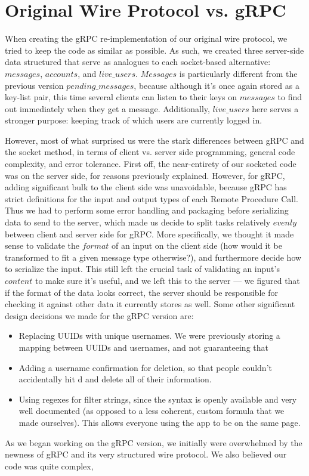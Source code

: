 \documentclass[
	a4paper, %
	10pt, %
	unnumberedsections, %
	twoside, %
]{LTJournalArticle}
\begin{document}
\section{Original Wire Protocol vs. gRPC}
When creating the gRPC re-implementation of our original wire protocol, we tried to keep the code as similar as possible. As such, we created three server-side data structured that serve as analogues to each socket-based alternative: $messages$, $accounts$, and $live\_users$. $Messages$ is particularly different from the previous version $pending\_messages$, because although it's once again stored as a key-list pair, this time several clients can listen to their keys on $messages$ to find out immediately when they get a message. Additionally, $live\_users$ here serves a stronger purpose: keeping track of which users are currently logged in.

However, most of what surprised us were the stark differences between gRPC and the socket method, in terms of client vs. server side programming, general code complexity, and error tolerance. First off, the near-entirety of our socketed code was on the server side, for reasons previously explained. However, for gRPC, adding significant bulk to the client side was unavoidable, because gRPC has strict definitions for the input and output types of each Remote Procedure Call. Thus we had to perform some error handling and packaging before serializing data to send to the server, which made us decide to split tasks relatively $evenly$ between client and server side for gRPC. More specifically, we thought it made sense to validate the $format$ of an input on the client side (how would it be transformed to fit a given message type otherwise?), and furthermore decide how to serialize the input. This still left the crucial task of validating an input's $content$ to make sure it's useful, and we left this to the server --- we figured that if the format of the data looks correct, the server should be responsible for checking it against other data it currently stores as well. Some other significant design decisions we made for the gRPC version are:
\begin{itemize}
    \item Replacing UUIDs with unique usernames. We were previously storing a mapping between UUIDs and usernames, and not guaranteeing that 
    \item Adding a username confirmation for deletion, so that people couldn't accidentally hit d and delete all of their information.
    \item Using regexes for filter strings, since the syntax is openly available and very well documented (as opposed to a less coherent, custom formula that we made ourselves). This allows everyone using the app to be on the same page.
\end{itemize}
As we began working on the gRPC version, we initially were overwhelmed by the newness of gRPC and its very structured wire protocol. We also believed our code was quite complex,
\end{document}
